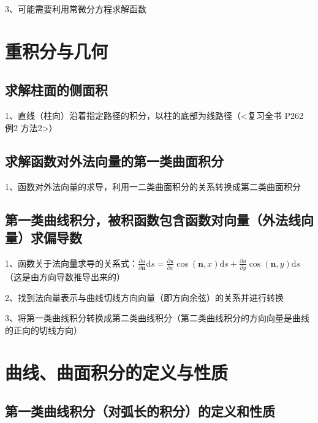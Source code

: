3、可能需要利用常微分方程求解函数

\section{重积分与几何}



\subsection{求解柱面的侧面积}

1、直线（柱向）沿着指定路径的积分，以柱的底部为线路径（<复习全书 P262 例2 方法2>）



\subsection{求解函数对外法向量的第一类曲面积分}

1、函数对外法向量的求导，利用一二类曲面积分的关系转换成第二类曲面积分



\subsection{第一类曲线积分，被积函数包含函数对向量（外法线向量）求偏导数}

1、函数关于法向量求导的关系式：$ \frac{\partial u}{\partial \boldsymbol{n}} \mathrm{d} s=\frac{\partial u}{\partial x} \cos (\boldsymbol{n}, x) \mathrm{d} s+\frac{\partial u}{\partial y} \cos (\boldsymbol{n}, y) \mathrm{d} s $（这是由方向导数推导出来的）

2、找到法向量表示与曲线切线方向向量（即方向余弦）的关系并进行转换

3、将第一类曲线积分转换成第二类曲线积分（第二类曲线积分的方向向量是曲线的正向的切线方向）

\section{曲线、曲面积分的定义与性质}



\subsection{第一类曲线积分（对弧长的积分）的定义和性质}


